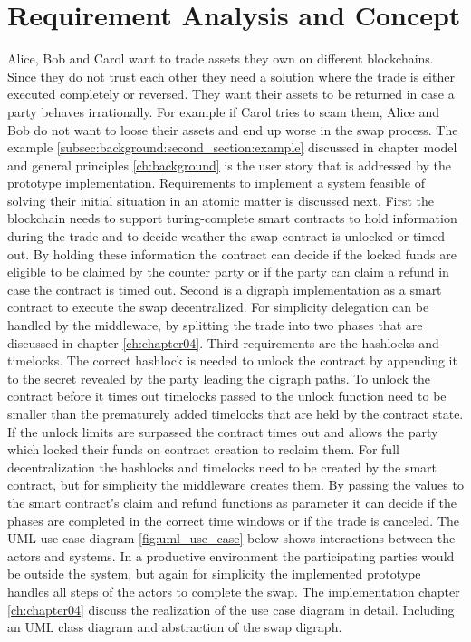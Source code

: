 \chapter{Requirement Analysis and Concept}
\label{ch:chapter03}
Alice, Bob and Carol want to trade assets they own on different blockchains. Since they do not trust each other they need a solution where the trade is either executed completely or reversed. They want their assets to be returned in case a party behaves irrationally. For example if Carol tries to scam them, Alice and Bob do not want to loose their assets and end up worse in the swap process. The example \ref{subsec:background:second_section:example} discussed in chapter model and general principles \ref{ch:background} is the user story that is addressed by the prototype implementation. Requirements to implement a system feasible of solving their initial situation in an atomic matter is discussed next. First the blockchain needs to support turing-complete smart contracts to hold information during the trade and to decide weather the swap contract is unlocked or timed out. By holding these information the contract can decide if the locked funds are eligible to be claimed by the counter party or if the party can claim a refund in case the contract is timed out. Second is a digraph implementation as a smart contract to execute the swap decentralized. For simplicity delegation can be handled by the middleware, by splitting the trade into two phases that are discussed in chapter \ref{ch:chapter04}. Third requirements are the hashlocks and timelocks. The correct hashlock is needed to unlock the contract by appending it to the secret revealed by the party leading the digraph paths. To unlock the contract before it times out timelocks passed to the unlock function need to be smaller than the prematurely added timelocks that are held by the contract state. If the unlock limits are surpassed the contract times out and allows the party which locked their funds on contract creation to reclaim them. For full decentralization the hashlocks and timelocks need to be created by the smart contract, but for simplicity the middleware creates them. By passing the values to the smart contract's claim and refund functions as parameter it can decide if the phases are completed in the correct time windows or if the trade is canceled. The UML use case diagram \ref{fig:uml_use_case} below shows interactions between the actors and systems. In a productive environment the participating parties would be outside the system, but again for simplicity the implemented prototype handles all steps of the actors to complete the swap. The implementation chapter \ref{ch:chapter04} discuss the realization of the use case diagram in detail. Including an UML class diagram and abstraction of the swap digraph.


